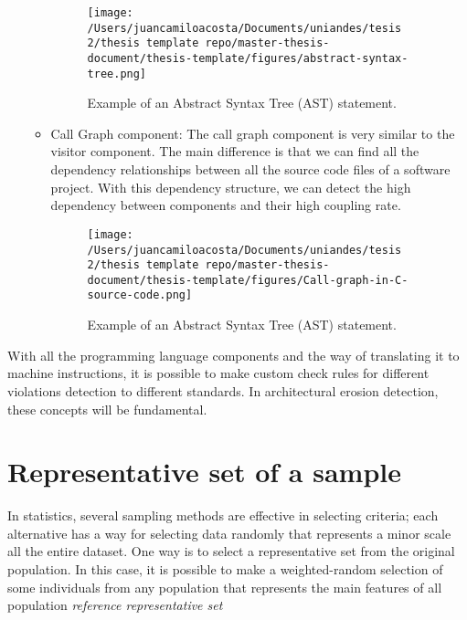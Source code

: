 \begin{itemize}
\begin{itemize}
\begin{figure}
    				\centering
    				\texttt{[image: /Users/juancamiloacosta/Documents/uniandes/tesis 2/thesis template repo/master-thesis-document/thesis-template/figures/abstract-syntax-tree.png]}
   				 \caption{Example of an Abstract Syntax Tree (AST) statement. \citet{} }
   				 \label{fig:ast}
			\end{figure}
			\item Call Graph component: The call graph component is very similar to the visitor component. The main difference is that we can find all the dependency relationships between all the source code files of a software project. With this dependency structure, we can detect the high dependency between components and their high coupling rate.
			\begin{figure}
    				\centering
    				\texttt{[image: /Users/juancamiloacosta/Documents/uniandes/tesis 2/thesis template repo/master-thesis-document/thesis-template/figures/Call-graph-in-C-source-code.png]}
   				 \caption{Example of an Abstract Syntax Tree (AST) statement. \citet{} }
   				 \label{fig:ast}
			\end{figure}
		\end{itemize}
\end{itemize}

With all the programming language components and the way of translating it to machine instructions, it is possible to make custom check rules for different violations detection to different standards. In architectural erosion detection, these concepts will be fundamental.

\section{Representative set of a sample}
In statistics, several sampling methods are effective in selecting criteria; each alternative has a way for selecting data randomly that represents a minor scale all the entire dataset. One way is to select a representative set from the original population. In this case, it is possible to make a weighted-random selection of some individuals from any population that represents the main features of all population \emph{reference representative set}

